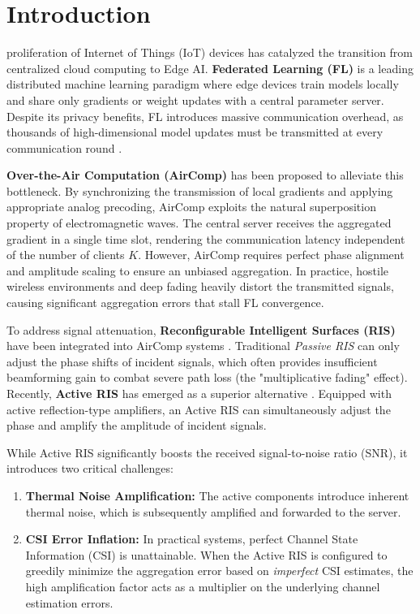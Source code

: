 \documentclass[lettersize,journal]{IEEEtran}
\begin{document}
\section{Introduction}
 proliferation of Internet of Things (IoT) devices has catalyzed the transition from centralized cloud computing to Edge AI. \textbf{Federated Learning (FL)} is a leading distributed machine learning paradigm where edge devices train models locally and share only gradients or weight updates with a central parameter server. Despite its privacy benefits, FL introduces massive communication overhead, as thousands of high-dimensional model updates must be transmitted at every communication round \cite{zhu2020broadband, yang2020federated}.

\textbf{Over-the-Air Computation (AirComp)} has been proposed to alleviate this bottleneck. By synchronizing the transmission of local gradients and applying appropriate analog precoding, AirComp exploits the natural superposition property of electromagnetic waves. The central server receives the aggregated gradient in a single time slot, rendering the communication latency independent of the number of clients $K$. However, AirComp requires perfect phase alignment and amplitude scaling to ensure an unbiased aggregation. In practice, hostile wireless environments and deep fading heavily distort the transmitted signals, causing significant aggregation errors that stall FL convergence.

To address signal attenuation, \textbf{Reconfigurable Intelligent Surfaces (RIS)} have been integrated into AirComp systems \cite{ni2021integrating}. Traditional \textit{Passive RIS} can only adjust the phase shifts of incident signals, which often provides insufficient beamforming gain to combat severe path loss (the "multiplicative fading" effect). Recently, \textbf{Active RIS} has emerged as a superior alternative \cite{long2021active, zhi2022active}. Equipped with active reflection-type amplifiers, an Active RIS can simultaneously adjust the phase and amplify the amplitude of incident signals.

While Active RIS significantly boosts the received signal-to-noise ratio (SNR), it introduces two critical challenges:
\begin{enumerate}
    \item \textbf{Thermal Noise Amplification:} The active components introduce inherent thermal noise, which is subsequently amplified and forwarded to the server.
    \item \textbf{CSI Error Inflation:} In practical systems, perfect Channel State Information (CSI) is unattainable. When the Active RIS is configured to greedily minimize the aggregation error based on \textit{imperfect} CSI estimates, the high amplification factor acts as a multiplier on the underlying channel estimation errors.
\end{enumerate}
\end{document}
